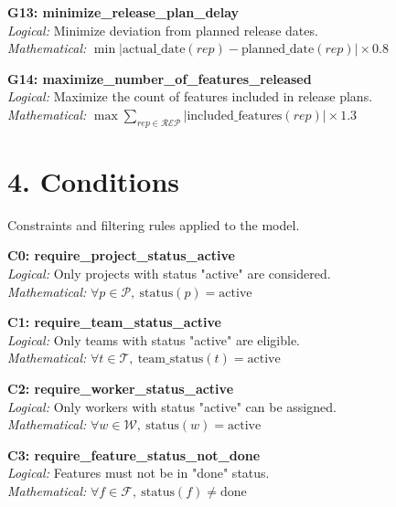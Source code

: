 \documentclass[12pt]{article}
\begin{document}
    \item \textbf{G13: minimize\_release\_plan\_delay} \\
    \textit{Logical:} Minimize deviation from planned release dates. \\
    \textit{Mathematical:} $ \min \left| \text{actual\_date}(rep) - \text{planned\_date}(rep) \right| \times 0.8 $

    \item \textbf{G14: maximize\_number\_of\_features\_released} \\
    \textit{Logical:} Maximize the count of features included in release plans. \\
    \textit{Mathematical:} $ \max \sum_{rep \in \mathcal{REP}} |\text{included\_features}(rep)| \times 1.3 $

\section{4. Conditions}

Constraints and filtering rules applied to the model.

\item \textbf{C0: require\_project\_status\_active} \\
    \textit{Logical:} Only projects with status "active" are considered. \\
    \textit{Mathematical:} $ \forall p \in \mathcal{P},\ \text{status}(p) = \text{active} $

    \item \textbf{C1: require\_team\_status\_active} \\
    \textit{Logical:} Only teams with status "active" are eligible. \\
    \textit{Mathematical:} $ \forall t \in \mathcal{T},\ \text{team\_status}(t) = \text{active} $

    \item \textbf{C2: require\_worker\_status\_active} \\
    \textit{Logical:} Only workers with status "active" can be assigned. \\
    \textit{Mathematical:} $ \forall w \in \mathcal{W},\ \text{status}(w) = \text{active} $

    \item \textbf{C3: require\_feature\_status\_not\_done} \\
    \textit{Logical:} Features must not be in "done" status. \\
    \textit{Mathematical:} $ \forall f \in \mathcal{F},\ \text{status}(f) \neq \text{done} $
\end{document}
